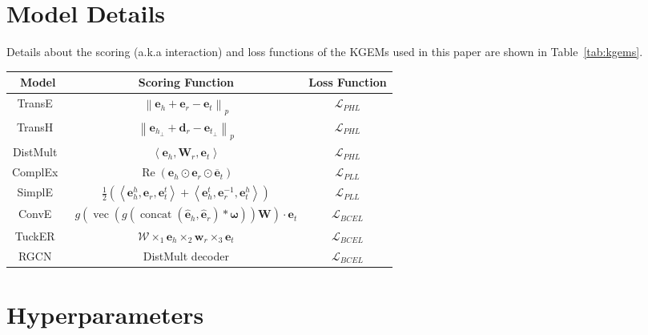 \documentclass[letterpaper]{article} %
\begin{document}
\clearpage
\appendix\label{appendix}

\section{Model Details}\label{appendix:models}
Details about the scoring (a.k.a interaction) and loss functions of the KGEMs used in this paper are shown in Table~\ref{tab:kgems}.

\begin{table*}[h]
\small
\centering
\caption{Characteristics of the KGEMs used in the experiments}\label{tab:kgems}
\begin{tabular}{ccc}
\hline
Model&\multicolumn{1}{c}{Scoring Function}&
\multicolumn{1}{c}{Loss Function}\\
\hline
TransE~\cite{transe}     &$\left\|\mathbf{e}_h+\mathbf{e}_r-\mathbf{e}_t\right\|_p$ & $\mathcal{L}_{PHL}$\\
TransH~\cite{transh}      &$\left\|\mathbf{e}_{h_{\perp}}+\mathbf{d}_{r}-\mathbf{e}_{t_{\perp}}\right\|_p$ & $\mathcal{L}_{PHL}$\\
DistMult~\cite{distmult}     &$\left\langle\mathbf{e}_{h}, \mathbf{W}_{r}, \mathbf{e}_{t}\right\rangle$ & $\mathcal{L}_{PHL}$\\ [7pt]
ComplEx~\cite{complex}      &$\operatorname{Re}\left(\mathbf{e}_{h} \odot \mathbf{e}_{r} \odot \overline{\mathbf{e}}_{t}\right)$ & $\mathcal{L}_{PLL}$\\
SimplE~\cite{simple}      &$\frac{1}{2}{\left(\left\langle\mathbf{e}_{h}^{h}, \mathbf{e}_{r}, \mathbf{e}_{t}^{t}\right\rangle + \left\langle\mathbf{e}_{h}^{t}, \mathbf{e}_{r}^{-1}, \mathbf{e}_{t}^{h}\right\rangle\right)}$ & $\mathcal{L}_{PLL}$\\[7pt]
ConvE~\cite{conve}     &${g\left(\operatorname{vec}\left(g\left({\operatorname{concat}}\left(\widehat{\mathbf{e}}_h, \widehat{\mathbf{e}}_r\right) * \mathbf{\omega}\right)\right) \mathbf{W}\right) \cdot \mathbf{e}_t}$ & $\mathcal{L}_{BCEL}$\\
TuckER~\cite{tucker}     &$\mathcal{W} \times_1 \mathbf{e}_h \times_2 \mathbf{w}_r \times_3 \mathbf{e}_t$ & $\mathcal{L}_{BCEL}$\\
RGCN~\cite{rgcn}      &DistMult decoder & $\mathcal{L}_{BCEL}$\\
\hline
\end{tabular}
\end{table*}

\section{Hyperparameters}\label{appendix:hyperparam}
\end{document}
